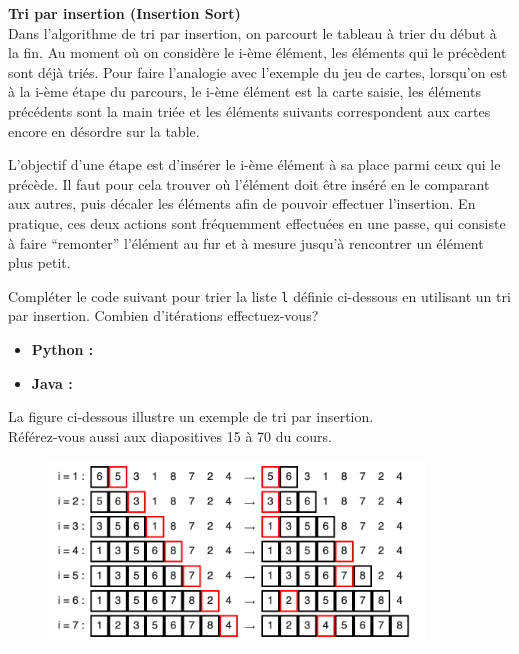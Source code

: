 \begin{Exercice} [20 minutes] \textbf{Tri par insertion (Insertion Sort)} \\

    Dans l'algorithme de tri par insertion, on parcourt le tableau à trier du début à la fin. Au moment où on considère le i-ème élément, les éléments qui le précèdent sont déjà triés. Pour faire l'analogie avec l'exemple du jeu de cartes, lorsqu'on est à la i-ème étape du parcours, le i-ème élément est la carte saisie, les éléments précédents sont la main triée et les éléments suivants correspondent aux cartes encore en désordre sur la table. 
    
    L'objectif d'une étape est d'insérer le i-ème élément à sa place parmi ceux qui le précède. Il faut pour cela trouver où l'élément doit être inséré en le comparant aux autres, puis décaler les éléments afin de pouvoir effectuer l'insertion. En pratique, ces deux actions sont fréquemment effectuées en une passe, qui consiste à faire ``remonter'' l'élément au fur et à mesure jusqu'à rencontrer un élément plus petit. 
    
    Compléter le code suivant pour trier la liste \lstinline{l} définie ci-dessous en utilisant un tri par insertion. Combien d'itérations effectuez-vous?
    \begin{itemize}
        \item \textbf{Python :}
             
        \item \textbf{Java :}
             
    \end{itemize}
    
    \begin{conseil}
        La figure ci-dessous illustre un exemple de tri par insertion. \\
        Référez-vous aussi aux diapositives 15 à 70 du cours.
    \end{conseil}
    
    \begin{figure}[h!]
        \centering
        \includegraphics[width=10cm]{ressources/tri_insertion.png}
    \end{figure}


\end{Exercice}
